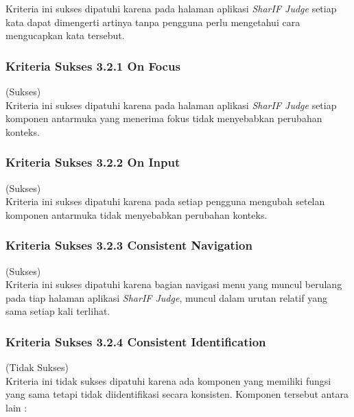 \documentclass[a4paper,twoside]{article}
\begin{document}
\begin{enumerate}
		Kriteria ini sukses dipatuhi karena pada halaman aplikasi \textit{SharIF Judge} setiap kata dapat dimengerti artinya tanpa pengguna perlu mengetahui cara mengucapkan kata tersebut.
		
		\subsubsection*{Kriteria Sukses 3.2.1 On Focus}
		\label{subsubsec:kepatuhan_kriteria_3.2.1}
		(Sukses) \\
		
		Kriteria ini sukses dipatuhi karena pada halaman aplikasi \textit{SharIF Judge} setiap komponen antarmuka yang menerima fokus tidak menyebabkan perubahan konteks.
		
		\subsubsection*{Kriteria Sukses 3.2.2 On Input}
		\label{subsubsec:kepatuhan_kriteria_3.2.2}
		(Sukses) \\
		
		Kriteria ini sukses dipatuhi karena pada setiap pengguna mengubah setelan komponen antarmuka tidak menyebabkan perubahan konteks.
		
		\subsubsection*{Kriteria Sukses 3.2.3 Consistent Navigation}
		\label{subsubsec:kepatuhan_kriteria_3.2.3}
		(Sukses) \\
		
		Kriteria ini sukses dipatuhi karena bagian navigasi menu yang muncul berulang pada tiap halaman aplikasi \textit{SharIF Judge}, muncul dalam urutan relatif yang sama setiap kali terlihat.
		
		\subsubsection*{Kriteria Sukses 3.2.4 Consistent Identification}
		\label{subsubsec:kepatuhan_kriteria_3.2.4}
		(Tidak Sukses) \\
		
		Kriteria ini tidak sukses dipatuhi karena ada komponen yang memiliki fungsi yang sama tetapi tidak diidentifikasi secara konsisten. Komponen tersebut antara lain :
		

\end{enumerate}
\end{document}
